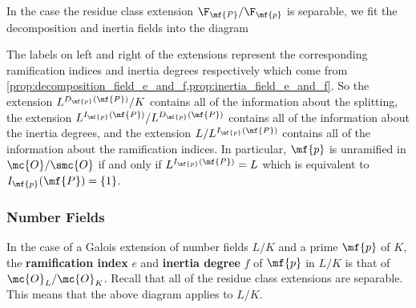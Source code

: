 \documentclass[12pt]{article}
\begin{document}
      In the case the residue class extension \(\F_{\mf{P}}/\F_{\mf{p}}\) is separable, we fit the decomposition and inertia fields into the diagram
      \begin{center}
      \end{center}
      The labels on left and right of the extensions represent the corresponding ramification indices and inertia degrees respectively which come from \cref{prop:decomposition_field_e_and_f,prop:inertia_field_e_and_f}. So the extension \(L^{D_{\mf{p}}(\mf{P})}/K\) contains all of the information about the splitting, the extension \(L^{I_{\mf{p}}(\mf{P})}/L^{D_{\mf{p}}(\mf{P})}\) contains all of the information about the inertia degrees, and the extension \(L/L^{I_{\mf{p}}(\mf{P})}\) contains all of the information about the ramification indices. In particular, \(\mf{p}\) is unramified in \(\mc{O}/\smc{O}\) if and only if \(L^{I_{\mf{p}}(\mf{P})} = L\) which is equivalent to \(I_{\mf{p}}(\mf{P}) = \{1\}\).
      \subsubsection*{Number Fields}
        In the case of a Galois extension of number fields \(L/K\) and a prime \(\mf{p}\) of \(K\), the \textbf{ramification index} \(e\) and \textbf{inertia degree} \(f\) of \(\mf{p}\) in \(L/K\) is that of \(\mc{O}_{L}/\mc{O}_{K}\). Recall that all of the residue class extensions are separable. This means that the above diagram applies to \(L/K\).
\end{document}
